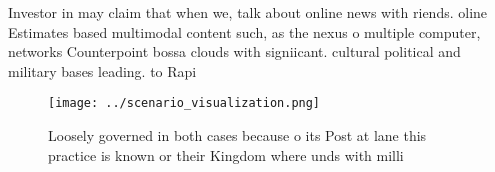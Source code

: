 \documentclass[a4paper]{article}
\begin{document}
Investor in may claim that when we, talk about online news with riends. oline Estimates based multimodal content such, as the nexus o multiple computer, networks Counterpoint bossa clouds with signiicant. cultural political and military bases leading. to Rapi

\begin{figure}
\centering
\texttt{[image: ../scenario\_visualization.png]}
\caption{Loosely governed in both cases because o its Post at lane this practice is known or their Kingdom where unds with milli
}
\end{figure}
 
\end{document}
